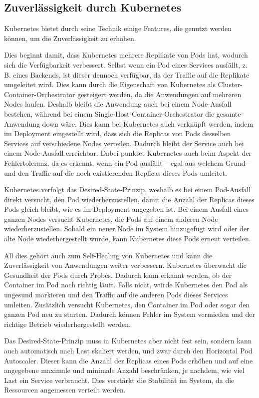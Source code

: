 \subsection{Zuverlässigkeit durch Kubernetes}

Kubernetes bietet durch seine Technik einige Features, die genutzt werden können, um die Zuverlässigkeit zu erhöhen.

Dies beginnt damit, dass Kubernetes mehrere Replikate von Pods hat, wodurch sich die Verfügbarkeit verbessert. Selbst wenn ein Pod eines Services ausfällt, z. B. eines Backends, ist dieser dennoch verfügbar, da der Traffic auf die Replikate umgeleitet wird.
Dies kann durch die Eigenschaft von Kubernetes als Cluster-Container-Orchestrator gesteigert werden, da die Anwendungen auf mehreren Nodes laufen. Deshalb bleibt die Anwendung auch bei einem Node-Ausfall bestehen, während bei einem Single-Host-Container-Orchestrator die gesamte Anwendung down wäre.
Dies kann bei Kubernetes auch verknüpft werden, indem im Deployment eingestellt wird, dass sich die Replicas von Pods desselben Services auf verschiedene Nodes verteilen. Dadurch bleibt der Service auch bei einem Node-Ausfall erreichbar.
Dabei punktet Kubernetes auch beim Aspekt der Fehlertoleranz, da es erkennt, wenn ein Pod ausfällt – egal aus welchem Grund – und den Traffic auf die noch existierenden Replicas dieses Pods umleitet.

Kubernetes verfolgt das Desired-State-Prinzip, weshalb es bei einem Pod-Ausfall direkt versucht, den Pod wiederherzustellen, damit die Anzahl der Replicas dieses Pods gleich bleibt, wie es im Deployment angegeben ist.
Bei einem Ausfall eines ganzen Nodes versucht Kubernetes, die Pods auf einem anderen Node wiederherzustellen. Sobald ein neuer Node im System hinzugefügt wird oder der alte Node wiederhergestellt wurde, kann Kubernetes diese Pods erneut verteilen.

All dies gehört auch zum Self-Healing von Kubernetes und kann die Zuverlässigkeit von Anwendungen weiter verbessern.
Kubernetes überwacht die Gesundheit der Pods durch Probes. Dadurch kann erkannt werden, ob der Container im Pod noch richtig läuft. Falls nicht, würde Kubernetes den Pod als ungesund markieren und den Traffic auf die anderen Pods dieses Services umleiten.
Zusätzlich versucht Kubernetes, den Container im Pod oder sogar den ganzen Pod neu zu starten.  Dadurch können Fehler im System vermieden und der richtige Betrieb wiederhergestellt werden.

Das Desired-State-Prinzip muss in Kubernetes aber nicht fest sein, sondern kann auch automatisch nach Last skaliert werden, und zwar durch den Horizontal Pod Autoscaler. 
Dieser kann die Anzahl der Replicas eines Pods erhöhen und auf eine angegebene maximale und minimale Anzahl beschränken, je nachdem, wie viel Last ein Service verbraucht.
Dies verstärkt die Stabilität im System, da die Ressourcen angemessen verteilt werden.

